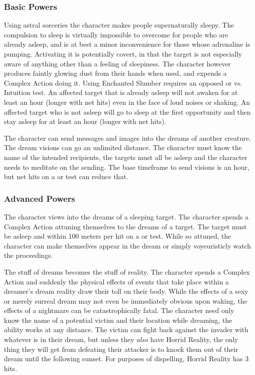 \subsubsection{Basic Powers}

 Using astral sorceries the character makes people supernaturally sleepy. The compulsion to sleep is virtually impossible to overcome for people who are already asleep, and is at best a minor inconvenience for those whose adrenaline is pumping. Activating it is potentially covert, in that the target is not especially aware of anything other than a feeling of sleepiness. The character however produces faintly glowing dust from their hands when used, and expends a Complex Action doing it. Using Enchanted Slumber requires an opposed  or  vs. Intuition test. An affected target that is already asleep will not awaken for at least an hour (longer with net hits) even in the face of loud noises or shaking. An affected target who is not asleep will go to sleep at the first opportunity and then stay asleep for at least an hour (longer with net hits).

 The character can send messages and images into the dreams of another creature. The dream visions can go an unlimited distance. The character must know the name of the intended recipients, the targets must all be asleep and the character needs to meditate on the sending. The base timeframe to send visions is an hour, but net hits on a  or  test can reduce that.


\subsubsection{Advanced Powers}

 The character views into the dreams of a sleeping target. The character spends a Complex Action attuning themselves to the dreams of a target. The target must be asleep and within 100 meters per hit on a  or  test. While so attuned, the character can make themselves appear in the dream or simply voyeuristicly  watch the proceedings.

 The stuff of dreams becomes the stuff of reality. The character spends a Complex Action and suddenly the physical effects of events that take place within a dreamer's dream reality draw their toll on their body. While the effects of a sexy or merely surreal dream may not even be immediately obvious upon waking, the effects of a nightmare can be catastrophically fatal. The character need only know the name of a potential victim and their location while dreaming, the ability works at any distance. The victim can fight back against the invader with whatever is in their dream, but unless they \textit{also} have Horrid Reality, the only thing they will get from defeating their attacker is to knock them out of their dream until the following sunset. For purposes of dispelling, Horrid Reality has 3 hits.

